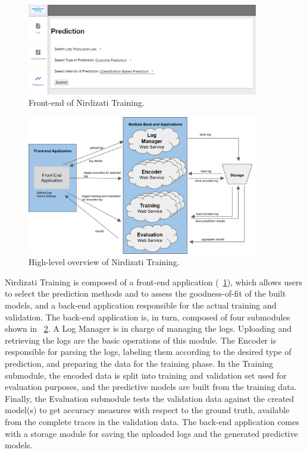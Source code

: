 \documentclass[runningheads,a4paper]{llncs}
\begin{document}
\begin{figure}[t!]%
	\centering
	 \includegraphics[width=0.9\textwidth]{img/nirdizati-frontend}
	\caption{Front-end of Nirdizati Training.}
	\label{fig:nirdizati-frontend}
	\vspace{-0.5\baselineskip}
\end{figure}
\begin{figure}[b!]%
	\centering
	 \includegraphics[width=0.9\textwidth]{img/nirdizati-training-architecture-rev}
	\caption{High-level overview of Nirdizati Training.}
	\label{fig:nirdizati-training}
	\vspace{-0.5\baselineskip}
\end{figure}


Nirdizati Training is composed of a front-end application (\figurename~\ref{fig:nirdizati-frontend}), which allows users to select the prediction methods
and to assess the goodness-of-fit of the built models, and a back-end application responsible for the actual training and validation.
The back-end application is, in turn, composed of four submodules shown in \figurename~\ref{fig:nirdizati-training}.
A Log Manager is in charge of managing the logs. Uploading and retrieving the logs are the basic operations
of this module. The Encoder is responsible for parsing the logs, labeling them according to the desired type of prediction,
 and preparing the data for the training phase.
In the Training submodule, the encoded data is split into training and validation set used for evaluation purposes,
and the predictive models are built from the training data. Finally, the Evaluation submodule
tests the validation data against the created model(s) to get accuracy measures with respect to the ground truth,
available from the complete traces in the validation data.
The back-end application comes with a storage module for saving the uploaded logs and the generated predictive models.
\end{document}
